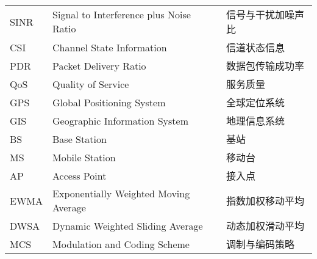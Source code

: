 \begin{supertabular}{lll}
SINR        & \hspace{0.5em}Signal to Interference plus Noise Ratio   & \hspace{0.5em}信号与干扰加噪声比 \\
CSI         & \hspace{0.5em}Channel State Information                 & \hspace{0.5em}信道状态信息 \\
PDR         & \hspace{0.5em}Packet Delivery Ratio                     & \hspace{0.5em}数据包传输成功率 \\
QoS         & \hspace{0.5em}Quality of Service                        & \hspace{0.5em}服务质量 \\
GPS         & \hspace{0.5em}Global Positioning System                 & \hspace{0.5em}全球定位系统 \\
GIS         & \hspace{0.5em}Geographic Information System             & \hspace{0.5em}地理信息系统 \\
BS          & \hspace{0.5em}Base Station                              & \hspace{0.5em}基站 \\
MS          & \hspace{0.5em}Mobile Station                            & \hspace{0.5em}移动台 \\
AP          & \hspace{0.5em}Access Point                              & \hspace{0.5em}接入点 \\
EWMA        & \hspace{0.5em}Exponentially Weighted Moving Average     & \hspace{0.5em}指数加权移动平均 \\
DWSA        & \hspace{0.5em}Dynamic Weighted Sliding Average          & \hspace{0.5em}动态加权滑动平均 \\
MCS         & \hspace{0.5em}Modulation and Coding Scheme              & \hspace{0.5em}调制与编码策略 \\

\end{supertabular}
